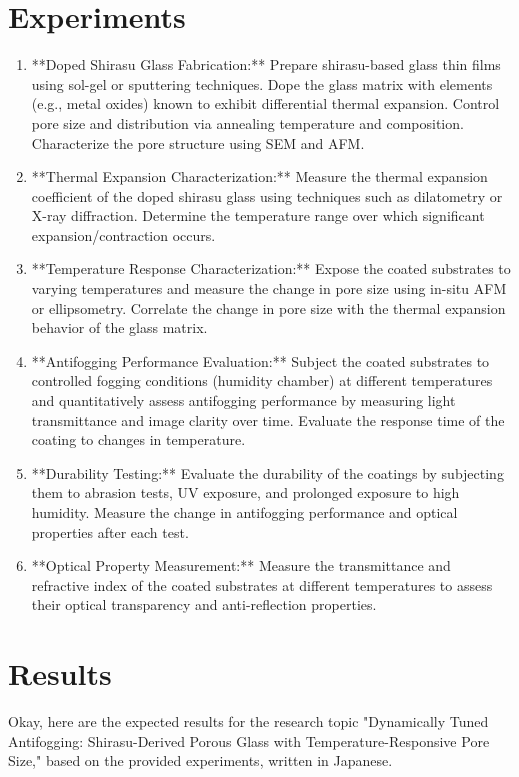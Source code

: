 \documentclass{article}
\begin{document}
\section{Experiments}
\begin{enumerate}
\item **Doped Shirasu Glass Fabrication:** Prepare shirasu-based glass thin films using sol-gel or sputtering techniques. Dope the glass matrix with elements (e.g., metal oxides) known to exhibit differential thermal expansion. Control pore size and distribution via annealing temperature and composition. Characterize the pore structure using SEM and AFM.
\item **Thermal Expansion Characterization:** Measure the thermal expansion coefficient of the doped shirasu glass using techniques such as dilatometry or X-ray diffraction. Determine the temperature range over which significant expansion/contraction occurs.
\item **Temperature Response Characterization:** Expose the coated substrates to varying temperatures and measure the change in pore size using in-situ AFM or ellipsometry. Correlate the change in pore size with the thermal expansion behavior of the glass matrix.
\item **Antifogging Performance Evaluation:** Subject the coated substrates to controlled fogging conditions (humidity chamber) at different temperatures and quantitatively assess antifogging performance by measuring light transmittance and image clarity over time. Evaluate the response time of the coating to changes in temperature.
\item **Durability Testing:** Evaluate the durability of the coatings by subjecting them to abrasion tests, UV exposure, and prolonged exposure to high humidity. Measure the change in antifogging performance and optical properties after each test.
\item **Optical Property Measurement:** Measure the transmittance and refractive index of the coated substrates at different temperatures to assess their optical transparency and anti-reflection properties.
\end{enumerate}
\section{Results}
Okay, here are the expected results for the research topic "Dynamically Tuned Antifogging: Shirasu-Derived Porous Glass with Temperature-Responsive Pore Size," based on the provided experiments, written in Japanese.
\end{document}
